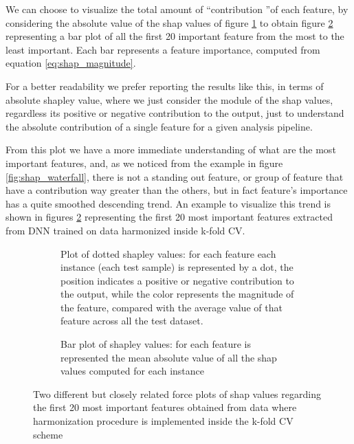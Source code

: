 \documentclass[11pt]{report}
\begin{document}
We can choose to visualize the total amount of \textquotedblleft contribution \textquotedblright of each feature, by considering the absolute value of the shap values of figure \ref{fig:shap_dot_kfold} to obtain figure \ref{fig:shap_bar_kfold} representing a bar plot of all the first 20 important feature from the most to the least important.
Each bar represents a feature importance, computed from equation \ref{eq:shap_magnitude}.

For a better readability we prefer reporting the results like this, in terms of absolute shapley value, where we just consider the module of the shap values, regardless its positive or negative contribution to the output, just to understand the absolute contribution of a single feature for a given analysis pipeline.

From this plot we have a more immediate understanding of what are the most important features, and, as we noticed from the example in figure \ref{fig:shap_waterfall}, there is not a standing out feature, or group of feature that have a contribution way greater than the others, but in fact feature's importance has a quite smoothed descending trend.
An example to visualize this trend is shown in figures \ref{fig:shap_bar_kfold} representing the first 20 most important features extracted from DNN trained on data harmonized inside k-fold CV.

\begin{figure}[h!]
\centering
\begin{subfigure}[t]{.45\linewidth}
   \caption{Plot of dotted shapley values: for each feature each instance (each test sample) is represented by a dot, the position indicates a positive or negative contribution to the output, while the color represents the magnitude of the feature, compared with the average value of that feature across all the test dataset.}
   \label{fig:shap_dot_kfold}
\end{subfigure}
\hspace{3mm}
\begin{subfigure}[t]{.439\linewidth}
   \caption{Bar plot of shapley values: for each feature is represented the mean absolute value of all the shap values computed for each instance}
   \label{fig:shap_bar_kfold}
\end{subfigure}
\caption{Two different but closely related force plots of shap values regarding the first 20 most important features obtained from data where harmonization procedure is implemented inside the k-fold CV scheme
}
\label{fig:shap_features_kfold_both}
\end{figure}
\end{document}

